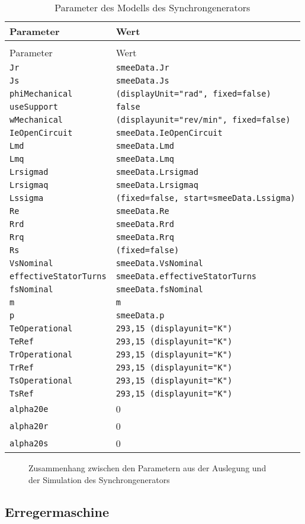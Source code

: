 \begin{longtable}[]{@{}ll@{}}
\caption{Parameter des Modells des Synchrongenerators}\label{tab:ParameterSG}
\tabularnewline
\toprule
Parameter & Wert\tabularnewline
\midrule
\endfirsthead
\caption{Parameter des Modells des Synchrongenerators}\tabularnewline
\toprule
Parameter & Wert\tabularnewline
\midrule
\endhead
\texttt{Jr} & \texttt{smeeData.Jr}\tabularnewline
\texttt{Js} & \texttt{smeeData.Js}\tabularnewline
\texttt{phiMechanical} &
\texttt{(displayUnit="rad",\ fixed=false)}\tabularnewline
\texttt{useSupport} & \texttt{false}\tabularnewline
\texttt{wMechanical} &
\texttt{(displayunit="rev/min",\ fixed=false)}\tabularnewline
\texttt{IeOpenCircuit} & \texttt{smeeData.IeOpenCircuit}\tabularnewline
\texttt{Lmd} & \texttt{smeeData.Lmd}\tabularnewline
\texttt{Lmq} & \texttt{smeeData.Lmq}\tabularnewline
\texttt{Lrsigmad} & \texttt{smeeData.Lrsigmad}\tabularnewline
\texttt{Lrsigmaq} & \texttt{smeeData.Lrsigmaq}\tabularnewline
\texttt{Lssigma} &
\texttt{(fixed=false,\ start=smeeData.Lssigma)}\tabularnewline
\texttt{Re} & \texttt{smeeData.Re}\tabularnewline
\texttt{Rrd} & \texttt{smeeData.Rrd}\tabularnewline
\texttt{Rrq} & \texttt{smeeData.Rrq}\tabularnewline
\texttt{Rs} & \texttt{(fixed=false)}\tabularnewline
\texttt{VsNominal} & \texttt{smeeData.VsNominal}\tabularnewline
\texttt{effectiveStatorTurns} &
\texttt{smeeData.effectiveStatorTurns}\tabularnewline
\texttt{fsNominal} & \texttt{smeeData.fsNominal}\tabularnewline
\texttt{m} & \texttt{m}\tabularnewline
\texttt{p} & \texttt{smeeData.p}\tabularnewline
\texttt{TeOperational} &
\texttt{293,15\ (displayunit="K")}\tabularnewline
\texttt{TeRef} & \texttt{293,15\ (displayunit="K")}\tabularnewline
\texttt{TrOperational} &
\texttt{293,15\ (displayunit="K")}\tabularnewline
\texttt{TrRef} & \texttt{293,15\ (displayunit="K")}\tabularnewline
\texttt{TsOperational} &
\texttt{293,15\ (displayunit="K")}\tabularnewline
\texttt{TsRef} & \texttt{293,15\ (displayunit="K")}\tabularnewline
\texttt{alpha20e} & 0\tabularnewline
\texttt{alpha20r} & 0\tabularnewline
\texttt{alpha20s} & 0\tabularnewline
\bottomrule
\end{longtable}

\begin{figure}[H]
	\centering
	
	\caption{Zusammenhang zwischen den Parametern aus der Auslegung und der Simulation des Synchrongenerators \label{fig:WebSG}}
\end{figure}

\subsection{Erregermaschine}\label{sec:Erregermaschine}

